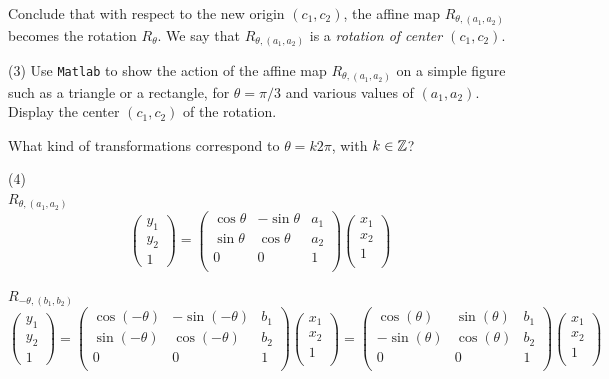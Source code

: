 \documentclass[12pt]{article}
\begin{document}
\medskip
Conclude that with respect to the new origin $(c_1, c_2)$, 
the affine map $R_{\theta, (a_1,a_2)}$ becomes the 
rotation $R_{\theta}$. We say that $R_{\theta, (a_1,a_2)}$ 
is a {\it rotation of center $(c_1, c_2)$\/}.

\medskip
(3)
Use {\tt Matlab} to show the action of  the affine map
$R_{\theta, (a_1,a_2)}$ on a simple figure such as
a triangle or a rectangle,
for $\theta = \pi/3$ and various values of $(a_1, a_2)$.
Display the center $(c_1, c_2)$ of the rotation.

\medskip
What kind of transformations correspond to
$\theta= k 2\pi$, with $k \in \mathbb{Z}$?


\medskip
(4) \\

$R_{\theta, (a_1,a_2)}$ \\
\[
\begin{pmatrix}
y_1 \\
y_2 \\
1
\end{pmatrix}
=
\begin{pmatrix}
\cos\theta & -\sin\theta & a_1 \\
\sin\theta & \cos\theta & a_2 \\
0 & 0 & 1 \\
\end{pmatrix}
\begin{pmatrix}
x_1 \\
x_2 \\
1 \\
\end{pmatrix}
\]

$R_{-\theta, (b_1,b_2)}$ \\
\[
\begin{pmatrix}
y_1 \\
y_2 \\
1
\end{pmatrix}
=
\begin{pmatrix}
\cos(-\theta) & -\sin(-\theta) & b_1 \\
\sin(-\theta) & \cos(-\theta) & b_2 \\
0 & 0 & 1 \\
\end{pmatrix}
\begin{pmatrix}
x_1 \\
x_2 \\
1 \\
\end{pmatrix}
=
\begin{pmatrix}
\cos(\theta) & \sin(\theta) & b_1 \\
-\sin(\theta) & \cos(\theta) & b_2 \\
0 & 0 & 1 \\
\end{pmatrix}
\begin{pmatrix}
x_1 \\
x_2 \\
1 \\
\end{pmatrix}
\] \\
\end{document}
